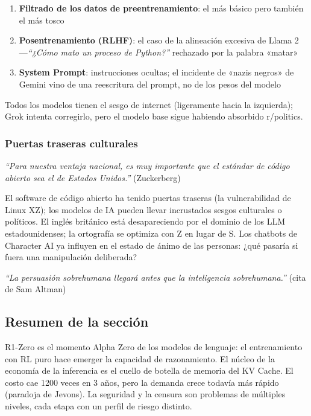 \begin{enumerate}
    \item \textbf{Filtrado de los datos de preentrenamiento}: el más básico pero también el más tosco
    \item \textbf{Posentrenamiento (RLHF)}: el caso de la alineación excesiva de Llama 2 —\textit{``¿Cómo mato un proceso de Python?''} rechazado por la palabra «matar»
    \item \textbf{System Prompt}: instrucciones ocultas; el incidente de «nazis negros» de Gemini vino de una reescritura del prompt, no de los pesos del modelo
\end{enumerate}

Todos los modelos tienen el sesgo de internet (ligeramente hacia la izquierda); Grok intenta corregirlo, pero el modelo base sigue habiendo absorbido r/politics.

\subsubsection{Puertas traseras culturales}

\textit{``Para nuestra ventaja nacional, es muy importante que el estándar de código abierto sea el de Estados Unidos.''} (Zuckerberg)

El software de código abierto ha tenido puertas traseras (la vulnerabilidad de Linux XZ); los modelos de IA pueden llevar incrustados sesgos culturales o políticos. El inglés británico está desapareciendo por el dominio de los LLM estadounidenses; la ortografía se optimiza con Z en lugar de S. Los chatbots de Character AI ya influyen en el estado de ánimo de las personas: ¿qué pasaría si fuera una manipulación deliberada?

\textit{``La persuasión sobrehumana llegará antes que la inteligencia sobrehumana.''} (cita de Sam Altman)

\subsection{Resumen de la sección}

R1-Zero es el momento Alpha Zero de los modelos de lenguaje: el entrenamiento con RL puro hace emerger la capacidad de razonamiento. El núcleo de la economía de la inferencia es el cuello de botella de memoria del KV Cache. El costo cae 1200 veces en 3 años, pero la demanda crece todavía más rápido (paradoja de Jevons). La seguridad y la censura son problemas de múltiples niveles, cada etapa con un perfil de riesgo distinto.
